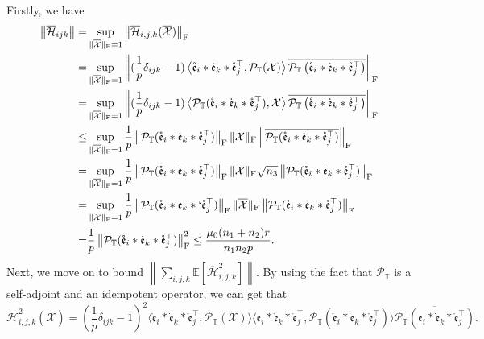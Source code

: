 \documentclass[twoside,12pt]{article}
\def\fro{{\mathrm{F}}}
\def\fro{{\mathrm{F}}}
\def\dme{{\dot{\mathfrak{e}}}}
\def\mrme{{\mathring{\mathfrak{e}}}}
\begin{document}
Firstly, we have 
\begin{align*}
 \left\|\overline{\mathcal{H}}_{i j k}\right\| 
= &\sup _{\|\overline{\mathcal{X}}\|_{\fro}=1}\left\|\overline{\mathcal{H}}_{i, j, k}(\overline{\mathcal{X}})\right\|_{\fro} \\
= & \sup _{\|\overline{\mathcal{X}}\|_{\fro}=1} \left\|(\frac{1}{p}\delta_{i j k}-1)\left\langle\mrme_i * \dme_k * \mrme_j^{\top}, \mathcal{P}_{\mathbb{T}}(\mathcal{X})\right\rangle \overline{\mathcal{P}_{\mathbb{T}}\left(\mrme_i * \dme_k * \mrme_j^{\top}\right)}\right\|_{\fro}\\
= & \sup _{\|\overline{\mathcal{X}}\|_{\fro}=1} \left\|(\frac{1}{p}\delta_{i j k}-1)\left\langle\mathcal{P}_{\mathbb{T}}(\mrme_i * \dme_k * \mrme_j^{\top}), \mathcal{X}\right\rangle \overline{\mathcal{P}_{\mathbb{T}}\left(\mrme_i * \dme_k * \mrme_j^{\top}\right)}\right\|_{\fro}\\
\leq & \sup _{\|\overline{\mathcal{X}}\|_{\fro}=1}\frac{1}{p}\left\|\mathcal{P}_{\mathbb{T}}(\mrme_i * \dme_k * \mrme_j^{\top})\right\|_{\fro}\|\mathcal{X}\|_{\fro} \left\|\overline{\mathcal{P}_{\mathbb{T}}(\mrme_i * \dme_k * \mrme_j^{\top})}\right\|_{\fro}\\
=& \sup _{\|\overline{\mathcal{X}}\|_{\fro}=1}\frac{1}{p}\left\|\mathcal{P}_{\mathbb{T}}(\mrme_i * \dme_k * \mrme_j^{\top})\right\|_{\fro}\|\mathcal{X}\|_{\fro} \sqrt{n_3}\left\|\mathcal{P}_{\mathbb{T}}(\mrme_i * \dme_k * \mrme_j^{\top})\right\|_{\fro}\\
=& \sup _{\|\overline{\mathcal{X}}\|_{\fro}=1}\frac{1}{p}\left\|\mathcal{P}_{\mathbb{T}}(\mrme_i * \dme_k * `   \mrme_j^{\top})\right\|_{\fro}\|\mathcal{\overline{X}}\|_{\fro} \left\|\mathcal{P}_{\mathbb{T}}(\mrme_i * \dme_k * \mrme_j^{\top})\right\|_{\fro}\\
= &\frac{1}{p}\left\|\mathcal{P}_{\mathbb{T}}(\mrme_i * \dme_k * \mrme_j^{\top})\right\|_{\fro}^2 
\leq   \frac{\mu_{0}(n_1+n_{2})r}{n_{1}n_{2}p}.
\end{align*}
Next, we move on to bound $\left\|\sum\limits_{i,j,k} \mathbb{E}\left[\overline{\mathcal{H}}_{i,j,k}^2\right]\right\|$.
By using the fact that $\mathcal{P}_{\mathbb{T}}$ is a self-adjoint and an idempotent operator, we can get that 
\[
\overline{\mathcal{H}}_{i,j,k}^2(\overline{\mathcal{X}})=\left(\frac{1}{p}\delta_{i j k}-1 \right)^2 \langle\mrme_i * \dme_k * \mrme_j^{\top}, \mathcal{P}_{\mathbb{T}}(\mathcal{X})\rangle
\langle\mathfrak{e}_i * \dme_k * \mrme_j^{\top}, \mathcal{P}_{\mathbb{T}}(\mrme_i * \dme_k * \mrme_j^{\top})\rangle
\overline{\mathcal{P}_{\mathbb{T}}
\left(\mathfrak{e}_i * \dme_k * \mrme_j^{\top}\right)}.\]
\end{document}
